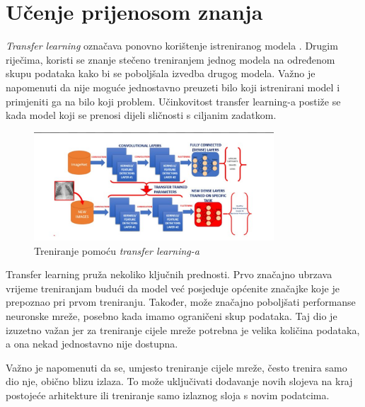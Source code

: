 
\chapter{Učenje prijenosom znanja}\label{ch:transfer-learning}

\emph{Transfer learning} označava ponovno korištenje istreniranog modela .
Drugim riječima, koristi se znanje stečeno treniranjem jednog modela na određenom skupu podataka kako bi se poboljšala izvedba drugog modela.
Važno je napomenuti da nije moguće jednostavno preuzeti bilo koji istrenirani model i primjeniti ga na bilo koji problem.
Učinkovitost transfer learning-a postiže se kada model koji se prenosi dijeli sličnosti s ciljanim zadatkom.

\FloatBarrier
\begin{figure}[h]
    \centering
    \includegraphics[width=0.8\textwidth]{images/Transfer-learning}
    \caption{Treniranje pomoću \emph{transfer learning-a}
    \protect\footnotemark}
    \label{fig:slika17}
\end{figure}
\FloatBarrier
{}

Transfer learning pruža nekoliko ključnih prednosti.
Prvo značajno ubrzava vrijeme treniranjam budući da model već posjeduje općenite značajke koje je prepoznao pri prvom treniranju.
Također, može značajno poboljšati performanse neuronske mreže, posebno kada imamo ograničeni skup podataka.
Taj dio je izuzetno važan jer za treniranje cijele mreže potrebna je velika količina podataka, a ona nekad jednostavno nije dostupna.

Važno je napomenuti da se, umjesto treniranje cijele mreže, često trenira samo dio nje, obično blizu izlaza.
To može uključivati dodavanje novih slojeva na kraj postojeće arhitekture ili treniranje samo izlaznog sloja s novim podatcima.
